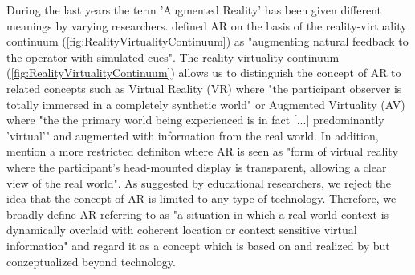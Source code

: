 During the last years the term 'Augmented Reality' has been given different meanings by varying researchers. \autocite [cf.][42]{Wu.2013} \cite{Milgram.1994b} defined AR on the basis of the reality-virtuality continuum (\ref{fig:RealityVirtualityContinuum}) as "augmenting natural feedback to the operator with simulated cues". The reality-virtuality continuum (\ref{fig:RealityVirtualityContinuum}) allows us to distinguish the concept of AR to related concepts such as Virtual Reality (VR) where "the participant observer is totally immersed in a completely synthetic world" or Augmented Virtuality (AV) where "the the primary world being experienced is in fact [...] predominantly 'virtual'"\autocite[4]{Milgram.1994} %
and augmented with information from the real world. In addition, \cite{Milgram.1994b} mention a more restricted definiton where AR is seen as "form of virtual reality where the participant's head-mounted display is transparent, allowing a clear view of the real world". \autocite[283]{Milgram.1994b} As suggested by educational researchers,\autocite[cf.][42]{Wu.2013} we reject the idea that the concept of AR is limited to any type of technology. Therefore, we broadly define AR referring to \cite{Klopfer.2008} as "a situation in which a real world context is dynamically overlaid with coherent location or context sensitive virtual information"\autocite[205]{Klopfer.2008} and regard it as a concept which is based on and realized by but conzeptualized beyond technology.

